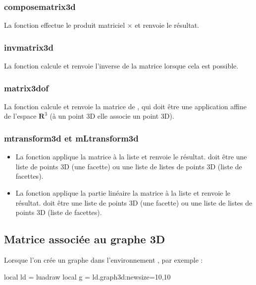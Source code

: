 \subsubsection{composematrix3d}
La fonction  effectue le produit matriciel $\times$ et renvoie le résultat.

\subsubsection{invmatrix3d}
La fonction  calcule et renvoie l'inverse de la matrice  lorsque cela est possible.

\subsubsection{matrix3dof}

La fonction  calcule et renvoie la matrice de , qui doit être une application affine de l'espace $\mathbf R^3$ (à un point 3D elle associe un point 3D).


\subsubsection{mtransform3d et mLtransform3d}

\begin{itemize}
    \item La fonction  applique la matrice  à la liste  et renvoie le résultat.  doit être une liste de points 3D (une facette) ou une liste de listes de points 3D (liste de facettes).
    \item La fonction  applique la partie linéaire la matrice  à la liste  et renvoie le résultat.  doit être une liste de points 3D (une facette) ou une liste de listes de points 3D (liste de facettes).
\end{itemize}

\subsection{Matrice associée au graphe 3D}

Lorsque l'on crée un graphe dans l'environnement \luadrawenv, par exemple :
\begin{Luacode}
local ld = luadraw
local g = ld.graph3d:new{size={10,10}}
\end{Luacode}

